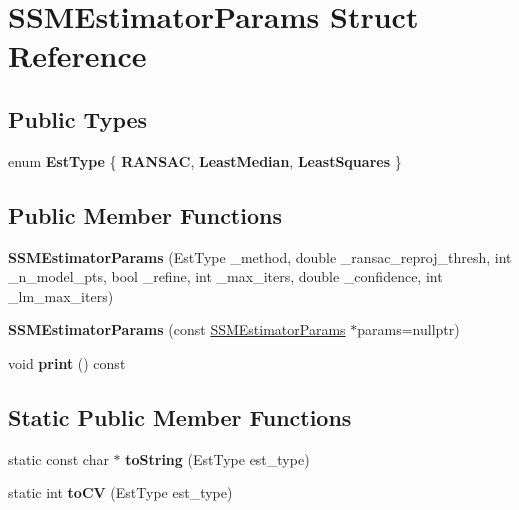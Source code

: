 \hypertarget{structSSMEstimatorParams}{\section{S\-S\-M\-Estimator\-Params Struct Reference}
\label{structSSMEstimatorParams}
}
\subsection*{Public Types}
\begin{DoxyCompactItemize}
\item 
enum {\bfseries Est\-Type} \{ {\bfseries R\-A\-N\-S\-A\-C}, 
{\bfseries Least\-Median}, 
{\bfseries Least\-Squares}
 \}
\end{DoxyCompactItemize}
\subsection*{Public Member Functions}
\begin{DoxyCompactItemize}
\item 
\hypertarget{structSSMEstimatorParams_aa6564554b10f6b76f6de746c0635eb1f}{{\bfseries S\-S\-M\-Estimator\-Params} (Est\-Type \-\_\-method, double \-\_\-ransac\-\_\-reproj\-\_\-thresh, int \-\_\-n\-\_\-model\-\_\-pts, bool \-\_\-refine, int \-\_\-max\-\_\-iters, double \-\_\-confidence, int \-\_\-lm\-\_\-max\-\_\-iters)}\label{structSSMEstimatorParams_aa6564554b10f6b76f6de746c0635eb1f}

\item 
\hypertarget{structSSMEstimatorParams_aa1cd82a5ce046d2d4a0d3ab07fd968f6}{{\bfseries S\-S\-M\-Estimator\-Params} (const \hyperlink{structSSMEstimatorParams}{S\-S\-M\-Estimator\-Params} $\ast$params=nullptr)}\label{structSSMEstimatorParams_aa1cd82a5ce046d2d4a0d3ab07fd968f6}

\item 
\hypertarget{structSSMEstimatorParams_a76bbdd61ec5252adc070887ddfa45499}{void {\bfseries print} () const }\label{structSSMEstimatorParams_a76bbdd61ec5252adc070887ddfa45499}

\end{DoxyCompactItemize}
\subsection*{Static Public Member Functions}
\begin{DoxyCompactItemize}
\item 
\hypertarget{structSSMEstimatorParams_ae45ae636e21135e082003e24c9b32c86}{static const char $\ast$ {\bfseries to\-String} (Est\-Type est\-\_\-type)}\label{structSSMEstimatorParams_ae45ae636e21135e082003e24c9b32c86}

\item 
\hypertarget{structSSMEstimatorParams_a1c4550e973c668d448f0cd96bd50155d}{static int {\bfseries to\-C\-V} (Est\-Type est\-\_\-type)}\label{structSSMEstimatorParams_a1c4550e973c668d448f0cd96bd50155d}

\end{DoxyCompactItemize}
